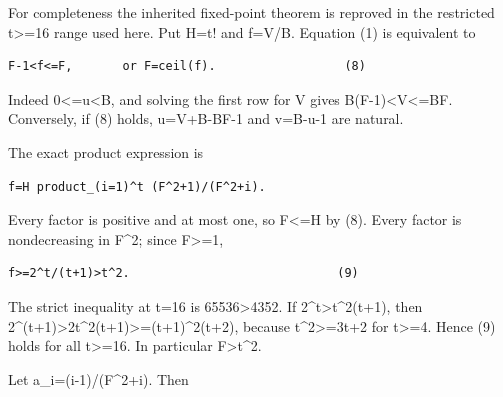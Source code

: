For completeness the inherited fixed-point theorem is reproved in the restricted t\textgreater{}\allowbreak{}=\allowbreak{}16 range used here. Put H=\allowbreak{}t! and f=\allowbreak{}V/\allowbreak{}B. Equation (1) is equivalent to



\begin{verbatim}
F-1<f<=F,       or F=ceil(f).                  (8)
\end{verbatim}

Indeed 0\textless{}\allowbreak{}=\allowbreak{}u\textless{}\allowbreak{}B, and solving the first row for V gives B(F-1)\textless{}\allowbreak{}V\textless{}\allowbreak{}=\allowbreak{}BF. Conversely, if (8) holds, u=\allowbreak{}V+\allowbreak{}B-BF-1 and v=\allowbreak{}B-u-1 are natural.



The exact product expression is



\begin{verbatim}
f=H product_(i=1)^t (F^2+1)/(F^2+i).
\end{verbatim}

Every factor is positive and at most one, so F\textless{}\allowbreak{}=\allowbreak{}H by (8). Every factor is nondecreasing in F\textasciicircum{}\allowbreak{}2; since F\textgreater{}\allowbreak{}=\allowbreak{}1,



\begin{verbatim}
f>=2^t/(t+1)>t^2.                             (9)
\end{verbatim}

The strict inequality at t=\allowbreak{}16 is 65536\textgreater{}\allowbreak{}4352. If 2\textasciicircum{}\allowbreak{}t\textgreater{}\allowbreak{}t\textasciicircum{}\allowbreak{}2(t+\allowbreak{}1), then 2\textasciicircum{}\allowbreak{}(t+\allowbreak{}1)\textgreater{}\allowbreak{}2t\textasciicircum{}\allowbreak{}2(t+\allowbreak{}1)\textgreater{}\allowbreak{}=\allowbreak{}(t+\allowbreak{}1)\textasciicircum{}\allowbreak{}2(t+\allowbreak{}2), because t\textasciicircum{}\allowbreak{}2\textgreater{}\allowbreak{}=\allowbreak{}3t+\allowbreak{}2 for t\textgreater{}\allowbreak{}=\allowbreak{}4. Hence (9) holds for all t\textgreater{}\allowbreak{}=\allowbreak{}16. In particular F\textgreater{}\allowbreak{}t\textasciicircum{}\allowbreak{}2.



Let a\_\allowbreak{}i=\allowbreak{}(i-1)/\allowbreak{}(F\textasciicircum{}\allowbreak{}2+\allowbreak{}i). Then



